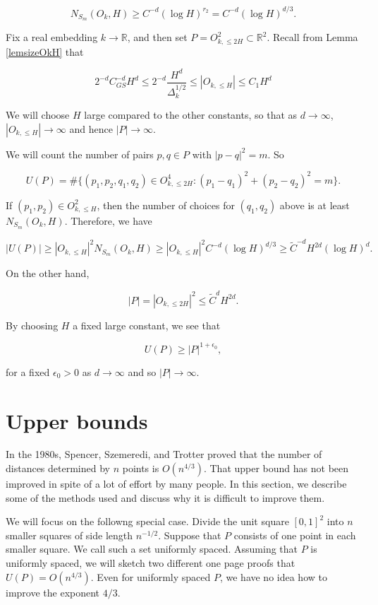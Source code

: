 \documentclass{amsart}
\newcommand{\RR}{\mathbb{R}}
\begin{document}
$$ N_{S_m}(O_k, H) \ge C^{-d} (\log H)^{r_2} = C^{-d} (\log H)^{d/3}. $$

Fix a real embedding $k \rightarrow \RR$,  and then set $P = O_{k,  \le 2 H}^2 \subset \RR^2$.   Recall from Lemma \ref{lemsizeOkH} that 

\begin{equation} \label{cardOkH}  2^{-d} C_{GS}^{-d} H^d \le 2^{-d} \frac{H^d}{\Delta_k^{1/2}} \le  |O_{k, \le H}| \le C_1 H^d
\end{equation}

We will choose $H$ large compared to the other constants,  so that as $d \rightarrow \infty$,  $|O_{k, \le H}| \rightarrow \infty$ and hence $|P| \rightarrow \infty$.  

We will count the number of pairs $p, q \in P$ with $|p - q|^2 = m$.   So

$$U(P) = \# \{ (p_1, p_2, q_1, q_2) \in O_{k, \le 2H}^4: (p_1 - q_1)^2 + (p_2 - q_2)^2 = m \}. $$

If $(p_1, p_2) \in O_{k, \le H}^2$,  then the number of choices for $(q_1,q_2)$ above is at least $N_{S_m}(O_k, H)$.   Therefore,  we have

$$ |U(P)| \ge |O_{k, \le H}|^2 N_{S_m}(O_k, H) \ge |O_{k, \le H}|^2 C^{-d} (\log H)^{d/3} \ge \tilde C^{-d} H^{2d} (\log H)^d. $$

On the other hand, 

$$ |P| = |O_{k, \le 2H}|^2 \le \tilde C^d H^{2d}. $$

By choosing $H$ a fixed large constant,  we see that

$$ U(P) \ge |P|^{1 + \epsilon_0}, $$

for a fixed $\epsilon_0 > 0$ as $d \rightarrow \infty$ and so $|P| \rightarrow \infty$.






\section{Upper bounds} \label{secupperbounds}

In the 1980s,  Spencer,  Szemeredi, and Trotter \cite{SST} proved that the number of distances determined by $n$ points is $O(n^{4/3})$.    That upper bound has not been improved in spite of a lot of effort by many people.   In this section,  we describe some of the methods used and discuss why it is difficult to improve them.

We will focus on the followng special case.   Divide the unit square $[0,1]^2$ into $n$ smaller squares of side length $n^{-1/2}$.   Suppose that $P$ consists of one point in each smaller square.   We call such a set uniformly spaced.   Assuming that $P$ is uniformly spaced,  we will sketch two different one page proofs that $U(P) = O(n^{4/3})$.   Even for uniformly spaced $P$,  we have no idea how to improve the exponent $4/3$.
\end{document}
